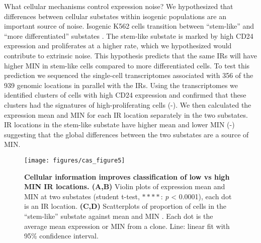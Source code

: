 What cellular mechanisms control expression noise? We hypothesized that differences between cellular substates within isogenic populations are an important source of noise. Isogenic K562 cells transition between \enquote{stem-like} and \enquote{more differentiated} substates \cite{litzenburgerum_changhy:SinglecellEpigenomic2017, moudgila_mitrard:SelfReportingTransposons2020}. The stem-like substate is marked by high CD24 expression and proliferates at a higher rate, which we hypothesized would contribute to extrinsic noise. This hypothesis predicts that the same IRs will have higher MIN in stem-like cells compared to more differentiated cells. To test this prediction we sequenced the single-cell transcriptomes associated with 356 of the 939 genomic locations in parallel with the IRs. Using the transcriptomes we identified clusters of cells with high CD24 expression and confirmed that these clusters had the signatures of high-proliferating cells (-). We then calculated the expression mean and MIN for each IR location separately in the two substates. IR locations in the stem-like substate have higher mean and lower MIN (-) suggesting that the global differences between the two substates are a source of MIN. 

\begin{figure}[tbp]  
    \centering
    \texttt{[image: figures/cas\_figure5]}
    \caption[Cellular information improves classification of MIN IR locations.]{%
        \textbf{Cellular information improves classification of low vs high MIN IR locations. (A,B)}
        Violin plots of expression mean  and MIN  at two substates (student t-test, $\ast\ast\ast\ast$: \textit{p} <  0.0001), each dot is an IR location.
        \textbf{(C,D)}
        Scatterplots of proportion of cells in the \enquote{stem-like} substate against mean  and MIN . Each dot is the average mean expression or MIN from a clone. Line: linear fit with 95\% confidence interval. 
        \legendcontdnote
    }
    \label{fig:cas_figure5}
\end{figure}

